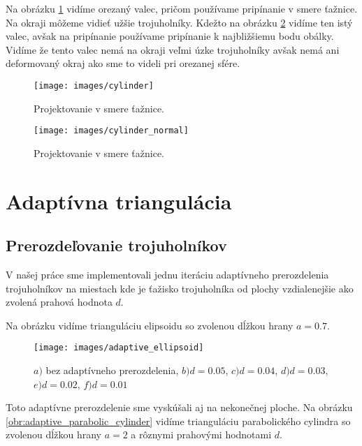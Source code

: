 Na obrázku \ref{obr:cylinder} vidíme orezaný valec, pričom používame
pripínanie v smere ťažnice. Na okraji môžeme vidieť užšie trojuholníky. 
Kdežto na obrázku \ref{obr:cylinder_normal} vidíme ten istý valec, 
avšak na pripínanie používame pripínanie k najbližšiemu bodu obálky.
Vidíme že tento valec nemá na okraji veľmi úzke trojuholníky avšak 
nemá ani deformovaný okraj ako sme to videli pri orezanej sfére.

\begin{figure}
    \centerline{\texttt{[image: images/cylinder]}}
    \caption[Projektovanie v smere ťažnice]{Projektovanie v smere ťažnice.}
    \label{obr:cylinder}
\end{figure}

\begin{figure}
    \centerline{\texttt{[image: images/cylinder\_normal]}}
    \caption[Projektovanie v smere ťažnice]{Projektovanie v smere ťažnice.}
    \label{obr:cylinder_normal}
\end{figure}

\section{Adaptívna triangulácia}
\subsection{Prerozdeľovanie trojuholníkov}

V našej práce sme implementovali jednu iteráciu adaptívneho prerozdelenia trojuholníkov
na miestach kde je ťažisko trojuholníka od plochy vzdialenejšie ako zvolená prahová hodnota $d$.

Na obrázku vidíme trianguláciu elipsoidu so zvolenou dĺžkou hrany $a=0.7$.

\begin{figure}
    \centerline{\texttt{[image: images/adaptive\_ellipsoid]}}
    \caption[Adaptívne prerozdelenie elipsoidu.]
    {$a)$ bez adaptívneho prerozdelenia, $b) d=0.05$, $c) d=0.04$, $d) d=0.03$, $e) d=0.02$, $f) d=0.01$}
    \label{obr:adaptive_ellipsoid}
\end{figure}


Toto adaptívne prerozdelenie sme vyskúšali aj na nekonečnej ploche.
Na obrázku \ref{obr:adaptive_parabolic_cylinder} vidíme trianguláciu parabolického 
cylindra so zvolenou dĺžkou hrany $a=2$ a rôznymi prahovými hodnotami $d$.

